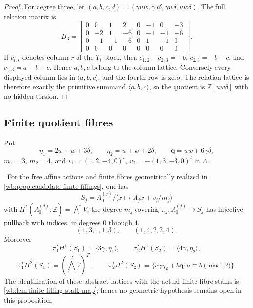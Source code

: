 \begin{proof}
For degree three, let
$(a,b,c,d)=(\gamma uw,\gamma u\delta,\gamma w\delta,uw\delta)$.
The full relation matrix is
\[
B_3=
\left[
\begin{array}{rrrr|rrrr}
0&0&1&2&0&-1&0&-3\\
0&-2&1&-6&0&-1&-1&-6\\
0&-1&-1&-6&0&1&-1&0\\
0&0&0&0&0&0&0&0
\end{array}
\right].
\tag{3.6b}
\]
If $c_{i,r}$ denotes column $r$ of the $T_i$ block, then
$c_{1,2}-c_{2,3}=-b$, $c_{2,3}=-b-c$, and
$c_{1,3}=a+b-c$.  Hence $a,b,c$ belong to the column lattice.
Conversely every displayed column lies in $\langle a,b,c\rangle$, and the
fourth row is zero.  The relation lattice is therefore exactly the primitive
summand $\langle a,b,c\rangle$, so the quotient is
$\mathbb Z[uw\delta]$ with no hidden torsion.
\end{proof}

\subsection{Finite quotient fibres}

Put
\[
\eta_1=2u+w+3\delta,\qquad
\eta_2=u+w+2\delta,\qquad
\mathbf q=uw+6\gamma\delta,
\]
$m_1=3$, $m_2=4$, and
$v_1=(1,2,-4,0)^t$, $v_2=-(1,3,-3,0)^t$ in $\Lambda$.

\begin{proposition}
\label{wb:prop:finite-indices}
\ For the free affine actions and finite fibres geometrically
realized in \cref{wb:prop:candidate-finite-fillings}, one has
\[
S_j=A_0^{(j)}/\langle x\mapsto A_jx+v_j/m_j\rangle
\]
with $H^*(A_0^{(j)};\mathbb Z)=\bigwedge^*V$, the
degree-$m_j$ covering $\pi_j:A_0^{(j)}\to S_j$ has injective pullback with
indices, in degrees $0$ through $4$,
\[
(1,3,1,1,3),\qquad (1,4,2,2,4).
\tag{3.7}
\]
Moreover
\[
\pi_1^*H^1(S_1)=\langle3\gamma,\eta_1\rangle,\qquad
\pi_2^*H^1(S_2)=\langle4\gamma,\eta_2\rangle,
\]
\[
\pi_1^*H^2(S_1)=(\textstyle\bigwedge^2V)^{T_1},\qquad
\pi_2^*H^2(S_2)
=\{a\gamma\eta_2+b\mathbf q:a\equiv b\pmod2\}.
\tag{3.8}
\]
The identification of these abstract lattices with the actual finite-fibre
stalks is \cref{wb:lem:finite-filling-stalk-map}; hence no geometric hypothesis
remains open in this proposition.
\end{proposition}

